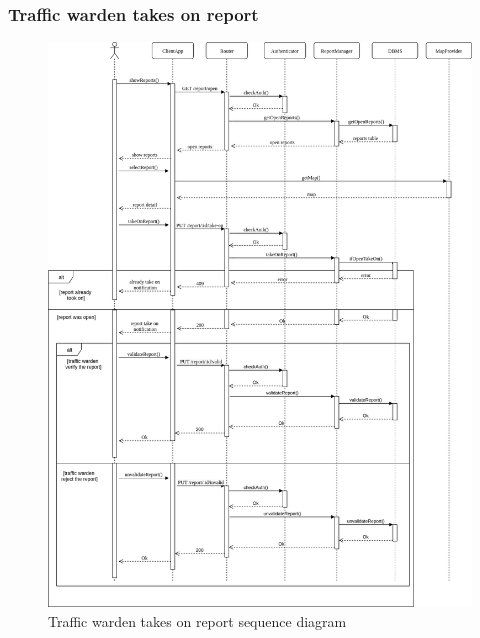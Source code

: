 \documentclass{article}
\begin{document}
\subsubsection{Traffic warden takes on report}
\label{sec:traffic-warden}
\begin{figure}[!htb]
\centering
	\includegraphics[width=1.0\textwidth]{images/traffic-warden-report.png}
	\caption{Traffic warden takes on report sequence diagram}
	\label{fig:traffic-warden-sequence}
\end{figure}

\newpage
\end{document}
